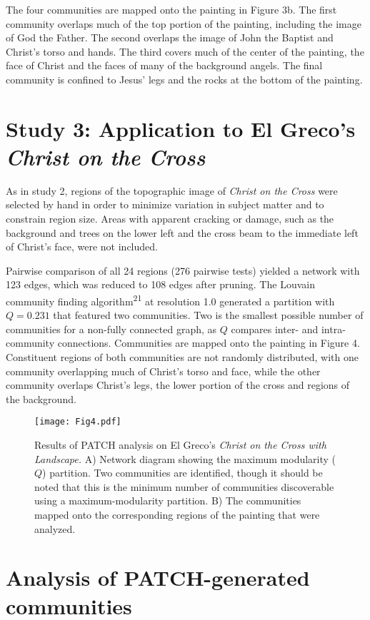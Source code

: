 \documentclass[11pt]{article}
\begin{document}
The four communities are mapped onto the painting in Figure 3b. The
first community overlaps much of the top portion of the painting,
including the image of God the Father. The second overlaps the image of
John the Baptist and Christ's torso and hands. The third covers much of
the center of the painting, the face of Christ and the faces of many of
the background angels. The final community is confined to Jesus' legs
and the rocks at the bottom of the painting.

\section*{Study 3: Application to El Greco's {\em Christ on the Cross}}

As in study 2, regions of the topographic image of \emph{Christ on the
Cross} were selected by hand in order to minimize variation in subject
matter and to constrain region size. Areas with apparent cracking or
damage, such as the background and trees on the lower left and the cross
beam to the immediate left of Christ's face, were not included.

Pairwise comparison of all 24 regions (276 pairwise tests) yielded a
network with 123 edges, which was reduced to 108 edges after pruning.
The Louvain community finding algorithm\textsuperscript{21} at
resolution 1.0 generated a partition with $Q=0.231$ that featured
two communities. Two is the smallest possible number of communities for
a non-fully connected graph, as $Q$ compares inter- and
intra-community connections. Communities are mapped onto the painting in
Figure 4. Constituent regions of both communities are not randomly
distributed, with one community overlapping much of Christ's torso and
face, while the other community overlaps Christ's legs, the lower
portion of the cross and regions of the background.

\begin{figure}
\texttt{[image: Fig4.pdf]}
\caption{Results of PATCH analysis on El Greco's \emph{Christ
on the Cross with Landscape.} A) Network diagram showing the maximum
modularity ($Q$) partition. Two communities are identified, though it
should be noted that this is the minimum number of communities
discoverable using a maximum-modularity partition. B) The communities
mapped onto the corresponding regions of the painting that were
analyzed.}
\end{figure}

\section*{Analysis of PATCH-generated communities}
\end{document}
